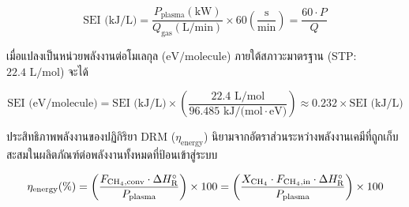 \begin{equation}
    \text{SEI (kJ/L)} = \frac{P_{\text{plasma}} (\text{kW})}{Q_{\text{gas}} (\text{L/min})} \times 60 \left( \frac{\text{s}}{\text{min}} \right) = \frac{60 \cdot P}{Q}
    \label{eq:sei_kjl}
\end{equation}

เมื่อแปลงเป็นหน่วยพลังงานต่อโมเลกุล ($\text{eV/molecule}$) ภายใต้สภาวะมาตรฐาน (STP: $22.4 \text{ L/mol}$) จะได้

\begin{equation}
    \text{SEI (eV/molecule)} = \text{SEI (kJ/L)} \times \left( \frac{22.4 \text{ L/mol}}{96.485 \text{ kJ/(mol}\cdot\text{eV)}} \right) \approx 0.232 \times \text{SEI (kJ/L)}
    \label{eq:sei_ev}
\end{equation}

ประสิทธิภาพพลังงานของปฏิกิริยา DRM ($\eta_{\text{energy}}$) นิยามจากอัตราส่วนระหว่างพลังงานเคมีที่ถูกเก็บสะสมในผลิตภัณฑ์ต่อพลังงานทั้งหมดที่ป้อนเข้าสู่ระบบ

\begin{equation}
    \eta_{\text{energy}} (\%) = \left( \frac{F_{\ce{CH4}, \text{conv}} \cdot \Delta H_{\text{R}}^\circ}{P_{\text{plasma}}} \right) \times 100 = \left( \frac{X_{\ce{CH4}} \cdot F_{\ce{CH4}, \text{in}} \cdot \Delta H_{\text{R}}^\circ}{P_{\text{plasma}}} \right) \times 100
    \label{eq:energy_eff}
\end{equation}

